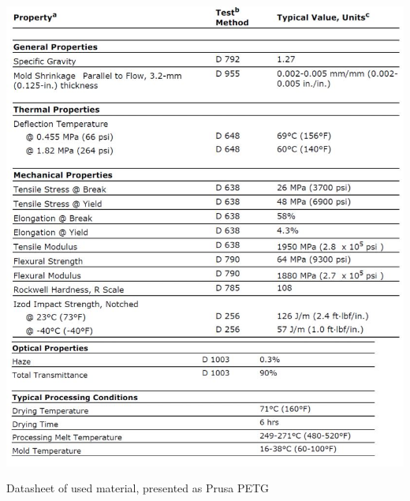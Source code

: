 \documentclass[a4paper, 11pt, reqno]{report}
\begin{document}
\newpage
\begin{table}[t!]
	\centering
	\renewcommand\figurename{Tab.}
	\includegraphics[scale=1]{datasheet}
	\caption{Datasheet of used material, presented as Prusa PETG}
\end{table}

\clearpage
\end{document}
